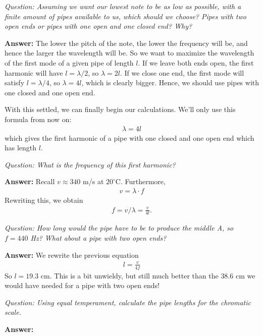 \textit{Question: Assuming we want our lowest note to be as low as possible, with a finite amount of pipes available to us, which should we choose? Pipes with two open ends or pipes with one open and one closed end? Why?}

\textbf{Answer:} The lower the pitch of the note, the lower the frequency will be, and hence the larger the wavelength will be. So we want to maximize the wavelength of the first mode of a given pipe of length $l$. If we leave both ends open, the first harmonic will have $l=\lambda/2$, so $\lambda = 2l$. If we close one end, the first mode will satisfy $l = \lambda/4$, so $\lambda = 4l$, which is clearly bigger. Hence, we should use pipes with one closed and one open end.

With this settled, we can finally begin our calculations. We'll only use this formula from now on:
\begin{align}
    \lambda = 4 l 
\end{align}
which gives the first harmonic of a pipe with one closed and one open end which has length $l$. 

\textit{Question: What is the frequency of this first harmonic?}

\textbf{Answer:} Recall $v \approx 340$ m/s at $20^\circ$C. Furthermore,
\begin{align}
    v = \lambda \cdot f 
\end{align} 
Rewriting this, we obtain
\begin{align}
    f = v/\lambda = \frac{v}{4l}.
\end{align}

\textit{Question: How long would the pipe have to be to produce the middle A, so $f = 440$ Hz? What about a pipe with two open ends?}

\textbf{Answer:} We rewrite the previous equation
\begin{align}
    l = \frac{v}{4f}
\end{align}
So $l = 19.3$ cm. This is a bit unwieldy, but still much better than the $38.6$ cm we would have needed for a pipe with two open ends!

\textit{Question: Using equal temperament, calculate the pipe lengths for the chromatic scale.}

\textbf{Answer:}

